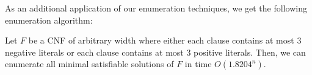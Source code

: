 \bigskip
{} 
As an additional application of our enumeration techniques, we get the following enumeration algorithm:
\begin{theorem}
\label{thm:enum3negate}
Let $F$ be a CNF of arbitrary width where either each clause contains at most $3$ negative literals or each clause contains at most $3$ positive literals. Then, we can enumerate all minimal satisfiable solutions of $F$ in time $O(1.8204^n)$.
\end{theorem}






















